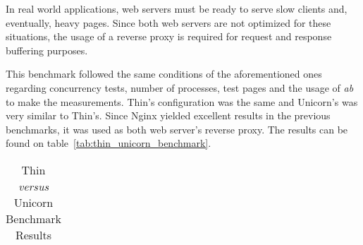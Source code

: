 In real world applications, web servers must be ready to serve slow clients and, eventually, heavy pages. Since both web servers are not optimized for these situations, the usage of a reverse proxy is required for request and response buffering purposes.

This benchmark followed the same conditions of the aforementioned ones regarding concurrency tests, number of processes, test pages and the usage of \textit{ab} to make the measurements. Thin's configuration was the same and Unicorn's was very similar to Thin's. Since Nginx yielded excellent results in the previous benchmarks, it was used as both web server's reverse proxy. The results can be found on table~\ref{tab:thin_unicorn_benchmark}.

\begin{table}[ht]
  \centering
  \caption{Thin \textit{versus} Unicorn Benchmark Results}
  \begin{tabular}{|c|c|c|c|c|c|}


\end{tabular}
\end{table}
